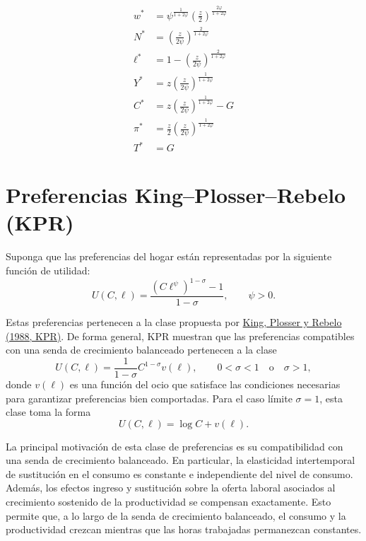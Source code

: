 \documentclass[11pt]{article}
\begin{document}
\[
\boxed{
\begin{aligned}
w^*
&=
\psi^{\frac{1}{1+2\varphi}}
\left(\frac{z}{2}\right)^{\frac{2\varphi}{1+2\varphi}}
\\[0.8em]
N^*
&=
\left(
\frac{z}{2\psi}
\right)^{\frac{2}{1+2\varphi}}
\\[0.8em]
\ell^*
&=
1-
\left(
\frac{z}{2\psi}
\right)^{\frac{2}{1+2\varphi}}
\\[0.8em]
Y^*
&=
z
\left(
\frac{z}{2\psi}
\right)^{\frac{1}{1+2\varphi}}
\\[0.8em]
C^*
&=
z
\left(
\frac{z}{2\psi}
\right)^{\frac{1}{1+2\varphi}}
-G
\\[0.8em]
\pi^*
&=
\frac{z}{2}
\left(
\frac{z}{2\psi}
\right)^{\frac{1}{1+2\varphi}}
\\[0.8em]
T^*
&=G
\end{aligned}
}
\]

\section{Preferencias King--Plosser--Rebelo (KPR)}

Suponga que las preferencias del hogar están representadas por la siguiente función de utilidad:
\[
U(C,\ell)
=
\frac{
\left(C \ell^{\psi} \right)^{1-\sigma} - 1
}{
1-\sigma
},
\qquad
\psi>0.
\]

Estas preferencias pertenecen a la clase propuesta por
\href{https://www.sciencedirect.com/science/article/abs/pii/030439328890030X}
{King, Plosser y Rebelo (1988, KPR)}. De forma general, KPR muestran que las
preferencias compatibles con una senda de crecimiento balanceado pertenecen a
la clase
\[
U(C,\ell)
=
\frac{1}{1-\sigma}C^{1-\sigma}v(\ell),
\qquad
0<\sigma<1
\quad \text{o} \quad
\sigma>1,
\]
donde $v(\ell)$ es una función del ocio que satisface las condiciones necesarias
para garantizar preferencias bien comportadas. Para el caso límite
$\sigma=1$, esta clase toma la forma
\[
U(C,\ell)
=
\log C+v(\ell).
\]

La principal motivación de esta clase de preferencias es su compatibilidad con una senda de crecimiento balanceado. En particular, la elasticidad intertemporal de sustitución en el consumo es constante e independiente del nivel de consumo. Además, los efectos ingreso y sustitución sobre la oferta laboral asociados al crecimiento sostenido de la productividad se compensan exactamente. Esto permite que, a lo largo de la senda de crecimiento balanceado, el consumo y la productividad crezcan mientras que las horas trabajadas permanezcan constantes.
\end{document}
